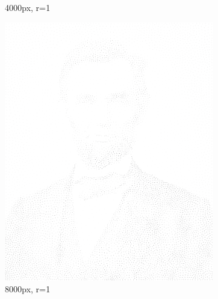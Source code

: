 \documentclass[11pt]{article}
\begin{document}
\begin{figure}[H]
\begin{subfigure}[b]{0.2\linewidth}
		\caption{4000px, r=1}
	\end{subfigure}
	\begin{subfigure}[b]{0.2\linewidth}
		\includegraphics[width=\linewidth]{pix/hc_AL_8000_r1.png}
		\caption{8000px, r=1}
	\end{subfigure}
	\begin{subfigure}[b]{0.2\linewidth}

\end{subfigure}
\end{figure}
\end{document}
